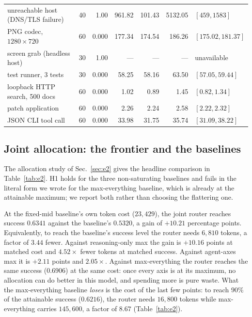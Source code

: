 \documentclass[10pt]{article} %
\begin{document}
\begin{table}[t]
\begin{center}
\begin{tabular}{lrrrrrl}
unreachable host (DNS/TLS failure)      & 40 & 1.00 & 961.82 & 101.43 & 5132.05 & $[459, 1583]$ \\
PNG codec, $1280\times720$              & 60 & 0.000 & 177.34 & 174.54 & 186.26 & $[175.02, 181.37]$ \\
screen grab (headless host)             & 30 & 1.00 & ---    & ---    & ---    & unavailable \\
test runner, 3 tests                    & 30 & 0.000 & 58.25  & 58.16  & 63.50  & $[57.05, 59.44]$ \\
loopback HTTP search, 500 docs          & 60 & 0.000 & 1.02   & 0.89   & 1.45   & $[0.82, 1.34]$ \\
patch application                       & 60 & 0.000 & 2.26   & 2.24   & 2.58   & $[2.22, 2.32]$ \\
JSON CLI tool call                      & 60 & 0.000 & 33.98  & 31.75  & 35.74  & $[31.09, 38.22]$ \\
\bottomrule
\end{tabular}
\end{center}
\end{table}

\subsection{Joint allocation: the frontier and the baselines}
\label{sec:res-e2}

The allocation study of Sec.~\ref{sec:e2} gives the headline comparison in Table~\ref{tab:e2}. H1 holds for the three
non-saturating baselines and fails in the literal form we wrote for the
max-everything baseline, which is already at the attainable maximum; we report
both rather than choosing the flattering one.

At the fixed-mid baseline's own token cost ($23{,}429$), the joint router reaches
success $0.6341$ against the baseline's $0.5320$, a gain of $+10.21$ percentage
points. Equivalently, to reach the baseline's success level the router needs
$6{,}810$ tokens, a factor of $3.44$ fewer. Against reasoning-only max the gain
is $+10.16$ points at matched cost and $4.52\times$ fewer tokens at matched
success. Against agent-axes max it is $+2.11$ points and $2.05\times$. Against
max-everything the router reaches the same success ($0.6906$) at the same cost:
once every axis is at its maximum, no allocation can do better in this model, and
spending more is pure waste. What the max-everything baseline \emph{loses} is the
cost of the last few points: to reach $90\%$ of the attainable success
($0.6216$), the router needs $16{,}800$ tokens while max-everything carries
$145{,}600$, a factor of $8.67$ (Table~\ref{tab:e2}).
\end{document}
